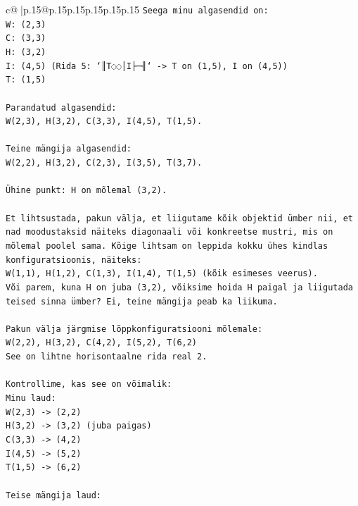 \documentclass{article}
\begin{document}
{\begin{supertabular}{c@{$\;$}|p{.15\linewidth}@{}p{.15\linewidth}p{.15\linewidth}p{.15\linewidth}p{.15\linewidth}p{.15\linewidth}}
{{{\texttt{Seega minu algasendid on:} \\
\texttt{W: (2,3)} \\
\texttt{C: (3,3)} \\
\texttt{H: (3,2)} \\
\texttt{I: (4,5) (Rida 5: `║T◌◌│I├─╢` {-}> T on (1,5), I on (4,5))} \\
\texttt{T: (1,5)} \\
\\ 
\texttt{Parandatud algasendid:} \\
\texttt{W(2,3), H(3,2), C(3,3), I(4,5), T(1,5).} \\
\\ 
\texttt{Teine mängija algasendid:} \\
\texttt{W(2,2), H(3,2), C(2,3), I(3,5), T(3,7).} \\
\\ 
\texttt{Ühine punkt: H on mõlemal (3,2).} \\
\\ 
\texttt{Et lihtsustada, pakun välja, et liigutame kõik objektid ümber nii, et nad moodustaksid näiteks diagonaali või konkreetse mustri, mis on mõlemal poolel sama. Kõige lihtsam on leppida kokku ühes kindlas konfiguratsioonis, näiteks:} \\
\texttt{W(1,1), H(1,2), C(1,3), I(1,4), T(1,5) (kõik esimeses veerus).} \\
\texttt{Või parem, kuna H on juba (3,2), võiksime hoida H paigal ja liigutada teised sinna ümber? Ei, teine mängija peab ka liikuma.} \\
\\ 
\texttt{Pakun välja järgmise lõppkonfiguratsiooni mõlemale:} \\
\texttt{W(2,2), H(3,2), C(4,2), I(5,2), T(6,2)} \\
\texttt{See on lihtne horisontaalne rida real 2.} \\
\\ 
\texttt{Kontrollime, kas see on võimalik:} \\
\texttt{Minu laud:} \\
\texttt{W(2,3) {-}> (2,2)} \\
\texttt{H(3,2) {-}> (3,2) (juba paigas)} \\
\texttt{C(3,3) {-}> (4,2)} \\
\texttt{I(4,5) {-}> (5,2)} \\
\texttt{T(1,5) {-}> (6,2)} \\
\\ 
\texttt{Teise mängija laud:} \\
}}}
\end{supertabular}}
\end{document}
